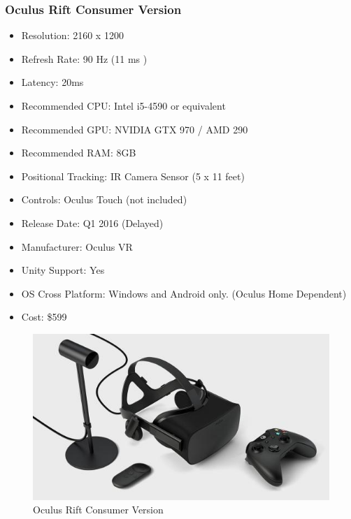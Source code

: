 \documentclass[a4paper,10pt]{article}
\begin{document}
\subsubsection{Oculus Rift Consumer Version}
\begin{itemize}
	\item Resolution: 2160 x 1200
	\item Refresh Rate: 90 Hz (11 ms )
	\item Latency: 20ms
	\item Recommended CPU: Intel i5-4590 or equivalent
	\item Recommended GPU: NVIDIA GTX 970 / AMD 290 
	\item Recommended RAM: 8GB
	\item Positional Tracking: IR Camera Sensor (5 x 11 feet)
	\item Controls: Oculus Touch (not included)
	\item Release Date: Q1 2016 (Delayed)
	\item Manufacturer: Oculus VR
	\item Unity Support: Yes
	\item OS Cross Platform: Windows and Android only. (Oculus Home Dependent)
	\item Cost: \$599
\end{itemize}
\begin{figure}[H]
	\includegraphics[width=\linewidth,height=\paperheight,keepaspectratio]{cv.jpg}
	\caption{Oculus Rift Consumer Version}
	\label{fig:RiftCVImg}
	\end{figure}
	\pagebreak
\end{document}

